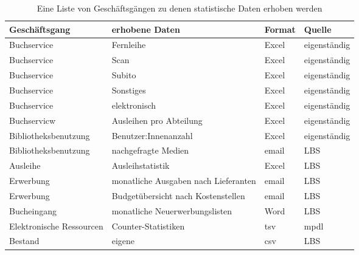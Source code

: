 \begin{table}[h]
    \centering
    \begin{adjustbox}{max width=\textwidth}
    \begin{tabular}{llll}
       \toprule
       \textbf{Geschäftsgang}& \textbf{erhobene Daten} & \textbf{Format} & \textbf{Quelle}\\
       \midrule     
            Buchservice              & Fernleihe                            & Excel  & eigenständig \\ 
            Buchservice              & Scan                                 & Excel  & eigenständig \\ 
            Buchservice              & Subito                               & Excel  & eigenständig \\ 
            Buchservice              & Sonstiges                            & Excel  & eigenständig \\ 
            Buchservice              & elektronisch                         & Excel  & eigenständig \\ 
            Buchservicw              & Ausleihen pro Abteilung              & Excel  & eigenständig \\ 
            Bibliotheksbenutzung     & Benutzer:Innenanzahl                 & Excel  & eigenständig \\ 
            Bibliotheksbenutzung     & nachgefragte Medien                  & email  & LBS          \\ 
            Ausleihe                 & Ausleihstatistik                     & Excel  & LBS          \\ 
            Erwerbung                & monatliche Ausgaben nach Lieferanten & email  & LBS          \\ 
            Erwerbung                & Budgetübersicht nach Kostenstellen   & email  & LBS          \\ 
            Bucheingang              & monatliche Neuerwerbungslisten       & Word   & LBS          \\ 
            Elektronische Ressourcen & Counter-Statistiken                  & tsv    & mpdl         \\ 
            Bestand                  & eigene                               & csv    & LBS          \\
        \bottomrule
    \end{tabular}
    \end{adjustbox}
    \caption{%
        Eine Liste von Geschäftsgängen zu denen statistische Daten erhoben werden
    }
    \label{tab:Geschäftsgänge}
    \end{table}


